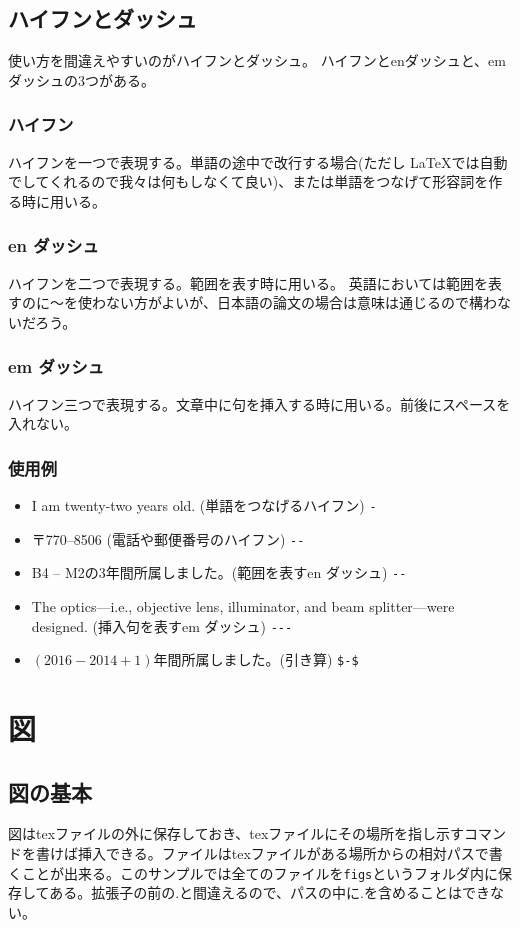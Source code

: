 \documentclass[a4j,openany,11px]{jsbook}
\begin{document}
\section{ハイフンとダッシュ}
使い方を間違えやすいのがハイフンとダッシュ。
ハイフンとenダッシュと、emダッシュの3つがある。

\subsection{ハイフン}
ハイフンを一つで表現する。単語の途中で改行する場合(ただし \LaTeX  では自動でしてくれるので我々は何もしなくて良い)、または単語をつなげて形容詞を作る時に用いる。

\subsection{en ダッシュ}
ハイフンを二つで表現する。範囲を表す時に用いる。
英語においては範囲を表すのに～を使わない方がよいが、日本語の論文の場合は意味は通じるので構わないだろう。

\subsection{em ダッシュ}
ハイフン三つで表現する。文章中に句を挿入する時に用いる。前後にスペースを入れない。

\subsection{使用例}
\begin{itemize}
 \item I am twenty-two years old. (単語をつなげるハイフン) \verb|-|
 \item 〒770--8506 (電話や郵便番号のハイフン)  \verb|--|
 \item B4 -- M2の3年間所属しました。(範囲を表すen ダッシュ) \verb|--|
 \item The optics---i.e., objective lens, illuminator, and beam splitter---were designed. (挿入句を表すem ダッシュ) \verb|---|
 \item $(2016-2014+1)$年間所属しました。(引き算) \verb|$-$|
\end{itemize}
\clearpage
\chapter{図\label{sec:figure}}
\section{図の基本}
図はtexファイルの外に保存しておき、texファイルにその場所を指し示すコマンドを書けば挿入できる。ファイルはtexファイルがある場所からの相対パスで書くことが出来る。このサンプルでは全てのファイルを\verb|figs|というフォルダ内に保存してある。拡張子の前の.と間違えるので、パスの中に.を含めることはできない。
\end{document}
